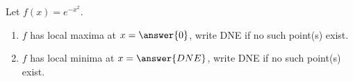 \documentclass{ximera}
\author{Gregory Hartman \and Matthew Carr}
\begin{document}
\begin{exercise}






Let $f(x)=e^{-x^2}$.
\begin{enumerate}
\item		$f$ has local maxima at $x=\answer{0}$, write DNE if no such point(s) exist.
\item		$f$ has local minima at $x=\answer{DNE}$, write DNE if no such point(s) exist.
\end{enumerate}

\end{exercise}
\end{document}
